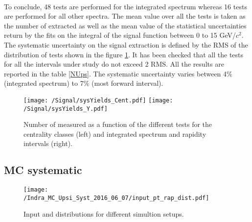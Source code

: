 \paragraph{}
To conclude, 48 tests are performed for the integrated spectrum whereas 16 tests are performed for all other spectra.
The mean value over all the tests is taken as the number of extracted \ups as well as the mean value of the statistical uncertainties return by the fits on the integral of the signal function between 0 to 15 GeV/$c^2$.
The systematic uncertainty on the signal extraction is defined by the RMS of the distribution of tests shown in the figure \ref{systSignal}.
It has been checked that all the tests for all the intervals under study do not exceed 2 RMS.
All the results are reported in the table \ref{NUps}.
The systematic uncertainty varies between 4\% (integrated spectrum) to 7\% (most forward interval). 

\begin{figure}[!t]
\begin{center}
\texttt{[image: /Signal/sysYields\_Cent.pdf]}
\texttt{[image: /Signal/sysYields\_Y.pdf]}
\end{center}
\caption{\label{systSignal}Number of measured \ups as a function of the different tests for the centrality classes (left) and integrated spectrum and rapidity intervals (right).}
\end{figure}




\subsection{MC systematic}

\begin{figure}[!b]
\begin{center}
  \texttt{[image: /Indra\_MC\_Upsi\_Syst\_2016\_06\_07/input\_pt\_rap\_dist.pdf]}
 \end{center} 
 \caption{\label{inputMC} Input \pt  and \y  distributions for different simultion setups.}
\end{figure}   

